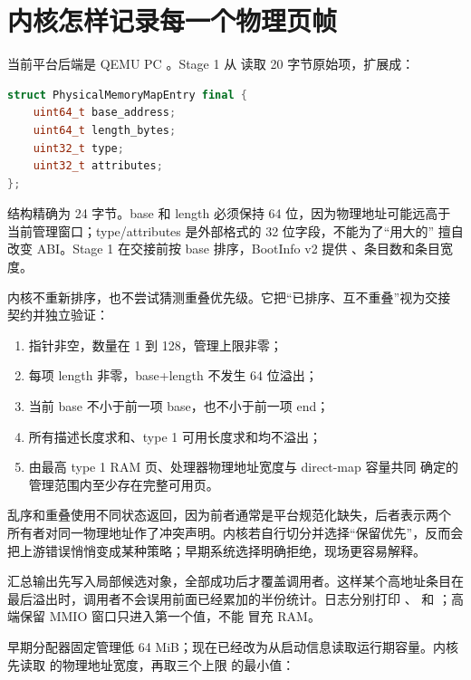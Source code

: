 \section{内核怎样记录每一个物理页帧}

当前平台后端是 QEMU PC 。Stage 1 从
 读取 20 字节原始项，扩展成：

\begin{lstlisting}[language=C++]
struct PhysicalMemoryMapEntry final {
    uint64_t base_address;
    uint64_t length_bytes;
    uint32_t type;
    uint32_t attributes;
};
\end{lstlisting}

结构精确为 24 字节。base 和 length 必须保持 64 位，因为物理地址可能远高于
当前管理窗口；type/attributes 是外部格式的 32 位字段，不能为了“用大的”
擅自改变 ABI。Stage 1 在交接前按 base 排序，BootInfo v2 提供
、条目数和条目宽度。

内核不重新排序，也不尝试猜测重叠优先级。它把“已排序、互不重叠”视为交接
契约并独立验证：

\begin{enumerate}[label=\arabic*.]
  \item 指针非空，数量在 1 到 128，管理上限非零；
  \item 每项 length 非零，base+length 不发生 64 位溢出；
  \item 当前 base 不小于前一项 base，也不小于前一项 end；
  \item 所有描述长度求和、type 1 可用长度求和均不溢出；
  \item 由最高 type 1 RAM 页、处理器物理地址宽度与 direct-map 容量共同
        确定的管理范围内至少存在完整可用页。
\end{enumerate}

乱序和重叠使用不同状态返回，因为前者通常是平台规范化缺失，后者表示两个
所有者对同一物理地址作了冲突声明。内核若自行切分并选择“保留优先”，反而会
把上游错误悄悄变成某种策略；早期系统选择明确拒绝，现场更容易解释。

汇总输出先写入局部候选对象，全部成功后才覆盖调用者。这样某个高地址条目在
最后溢出时，调用者不会误用前面已经累加的半份统计。日志分别打印
、 和
；高端保留 MMIO 窗口只进入第一个值，不能
冒充 RAM。

早期分配器固定管理低 64 MiB；现在已经改为从启动信息读取运行期容量。内核
先读取  的物理地址宽度，再取三个上限
的最小值：

